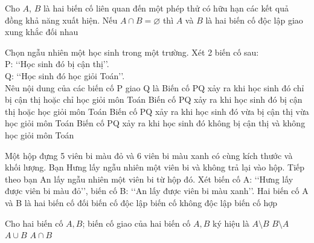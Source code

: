 \begin{ex}%
	Cho $A$, $B$ là hai biến cố liên quan đến một phép thử có hữu hạn các kết quả  đồng khả năng xuất hiện. Nếu $A\cap B=\varnothing$ thì $A$ và $B$ là hai biến cố
	 \choice
		{độc  lập}
		 {giao}
		{\True xung khắc} 
		 {đối nhau}
\end{ex}

\begin{ex}%
	Chọn ngẫu nhiên một học sinh trong một trường. Xét 2  biến cố sau:\\
	P: \lq\lq Học sinh đó bị cận thị\rq\rq  .\\
	Q:  \lq\lq Học sinh đó học giỏi Toán\rq\rq .\\
	Nêu nội dung  của các biến cố P giao Q là
	 \choice
		{Biến cố PQ xảy ra khi học sinh đó chỉ bị cận thị hoặc chỉ  học giỏi môn Toán}
		{Biến cố PQ xảy ra khi học sinh đó bị cận thị  hoặc học giỏi môn Toán}
		{\True Biến cố PQ xảy ra khi học sinh đó vừa bị cận thị vừa học giỏi  môn Toán}
		{Biến cố PQ xảy ra khi học sinh đó không bị cận thị và không  học giỏi môn Toán}
\end{ex}

\begin{ex}%
	Một hộp đựng 5 viên bi màu đỏ và 6 viên bi màu xanh có cùng kích thước và khối lượng. Bạn Hưng lấy ngẫu nhiên một viên bi và không trả lại vào hộp. Tiếp theo bạn An lấy ngẫu nhiên một  viên bi từ hộp đó. Xét biến cố A: \lq\lq Hưng lấy được viên bi màu đỏ\rq\rq , biến cố B: \lq\lq An lấy được viên bi màu xanh\rq\rq . Hai biến cố A và B là hai
	\choice 
		 {biến cố đối}
		 {biến cố độc lập}
		{\True biến  cố không độc lập}
		{biến cố  hợp}
\end{ex}

\begin{ex}%
	Cho hai biến cố $A,B$;  biến cố giao của hai biến cố $A,B$ ký hiệu là
	 \choice
		{$A\setminus B$} 
		{$B\setminus A$} 
		{$A\cup  B$}
		{\True  $A\cap B$}
\end{ex}
